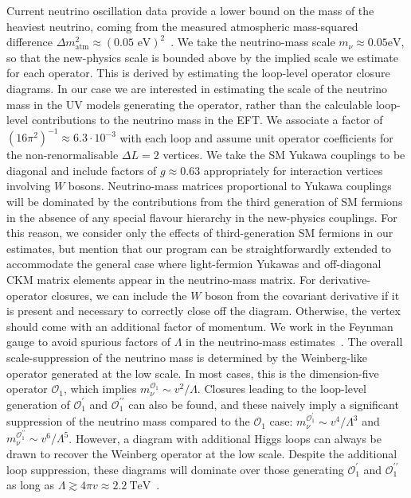 Current neutrino oscillation data provide a lower bound on the mass of the
heaviest neutrino, coming from the measured atmospheric mass-squared difference
$\Delta m^{2}_{\text{atm}} \approx (0.05 \text{ eV})^{2}$~\cite{nufitweb,
  Esteban:2018azc}. We take the neutrino-mass scale $m_{\nu} \approx 0.05 \text{
  eV}$, so that the new-physics scale is bounded above by the implied scale we
estimate for each operator. This is derived by estimating the loop-level
operator closure diagrams. In our case we are interested in estimating the scale
of the neutrino mass in the UV models generating the operator, rather than the
calculable loop-level contributions to the neutrino mass in the EFT. We
associate a factor of $(16\pi^{2})^{-1} \approx 6.3 \cdot 10^{-3}$ with each
loop and assume unit operator coefficients for the non-renormalisable
$\Delta L = 2$ vertices. We take the SM Yukawa couplings to be diagonal and
include factors of $g \approx 0.63$ appropriately for interaction vertices
involving $W$ bosons. Neutrino-mass matrices proportional to Yukawa couplings
will be dominated by the contributions from the third generation of SM fermions
in the absence of any special flavour hierarchy in the new-physics couplings.
For this reason, we consider only the effects of third-generation SM fermions in
our estimates, but mention that our program can be straightforwardly extended to
accommodate the general case where light-fermion Yukawas and off-diagonal CKM
matrix elements appear in the neutrino-mass matrix. For derivative-operator
closures, we can include the $W$ boson from the covariant derivative if it is
present and necessary to correctly close off the diagram. Otherwise, the vertex
should come with an additional factor of momentum. We work in the Feynman gauge
to avoid spurious factors of $\Lambda$ in the neutrino-mass
estimates~\cite{delAguila:2012nu}. The overall scale-suppression of the neutrino
mass is determined by the Weinberg-like operator generated at the low scale. In
most cases, this is the dimension-five operator $\mathcal{O}_{1}$, which implies
$m^{\mathcal{O}_{1}}_{\nu} \sim v^{2} / \Lambda$. Closures leading to the
loop-level generation of $\mathcal{O}_{1}^{\prime}$ and
$\mathcal{O}_{1}^{\prime\prime}$ can also be found, and these naively imply a
significant suppression of the neutrino mass compared to the $\mathcal{O}_{1}$
case: $m^{\mathcal{O}_{1}^{\prime}}_{\nu} \sim v^{4}/ \Lambda^{3}$ and
$m^{\mathcal{O}_{1}^{\prime\prime}}_{\nu} \sim v^{6} / \Lambda^{5}$. However, a
diagram with additional Higgs loops can always be drawn to recover the Weinberg
operator at the low scale. Despite the additional loop suppression, these
diagrams will dominate over those generating $\mathcal{O}_{1}^{\prime}$ and
$\mathcal{O}_{1}^{\prime\prime}$ as long as
$\Lambda \gtrsim 4 \pi v \approx \SI{2.2}{\TeV}$~\cite{Babu:2001ex,
  deGouvea:2007qla}.

